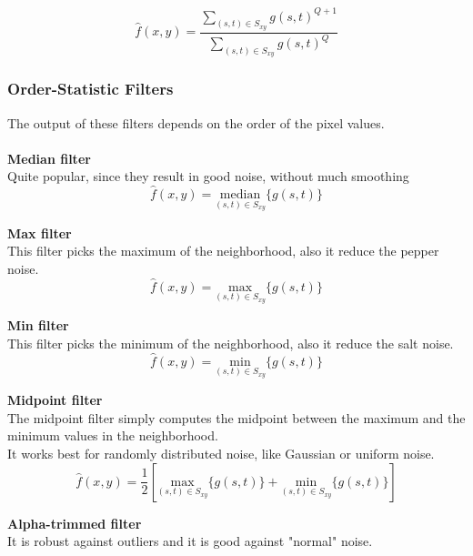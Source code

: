 \begin{equation}
	\hat{f}(x,y)= \frac{\sum\limits_{(s,t)\in S_{xy}} g(s,t)^{Q+1}}{\sum\limits_{(s,t)\in S_{xy}} g(s,t)^Q}
\end{equation}

\subsubsection{Order-Statistic Filters }

The output of these filters depends on the order of the pixel values. \\ \\

\textbf{Median filter}\\
Quite popular, since they result in good noise, without much smoothing \\
\begin{equation}
	\hat{f}(x,y)=\underset{(s,t) \in S_{xy}}{\text{median}}\{g(s,t) \}
\end{equation}

\textbf{Max filter}\\
This filter picks the maximum of the neighborhood, also it reduce the pepper noise.
\begin{equation}
	\hat{f}(x,y)=\underset{(s,t) \in S_{xy}}{\text{max}}\{g(s,t) \}
\end{equation}

\textbf{Min filter}\\
This filter picks the minimum of the neighborhood, also it reduce the salt noise.
\begin{equation}
	\hat{f}(x,y)=\underset{(s,t) \in S_{xy}}{\text{min}}\{g(s,t) \}
\end{equation}

\textbf{Midpoint filter}\\
The midpoint filter simply computes the midpoint between the maximum and the minimum values in the neighborhood. \\
It works best for randomly distributed noise, like Gaussian or uniform noise.
\begin{equation}
	\hat{f}(x,y)=\frac{1}{2} \left[ \underset{(s,t) \in S_{xy}}{\text{max}}\{g(s,t) \} + \underset{(s,t) \in S_{xy}}{\text{min}}\{g(s,t) \}\right]
\end{equation}

\textbf{Alpha-trimmed filter}\\
It is robust against outliers and it is good against "normal" noise.\\ 

